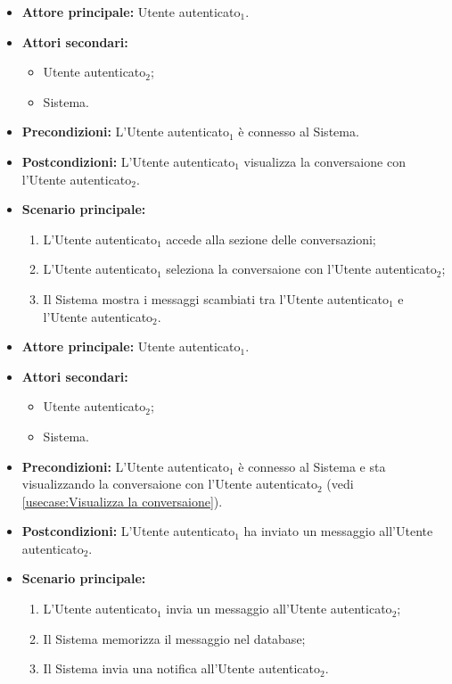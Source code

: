 \label{usecase:Visualizza la conversaione}
\begin{itemize}
	\item \textbf{Attore principale:} Utente autenticato$_1$.
	\item \textbf{Attori secondari:}
	      \begin{itemize}
		      \item Utente autenticato$_2$;
		      \item Sistema.
	      \end{itemize}
	\item \textbf{Precondizioni:} L'Utente autenticato$_1$ è connesso al
	      Sistema.
	\item \textbf{Postcondizioni:} L'Utente autenticato$_1$ visualizza la conversaione
	      con l'Utente autenticato$_2$.

	\item \textbf{Scenario principale:}
	      \begin{enumerate}
		      \item L'Utente autenticato$_1$ accede alla sezione delle conversazioni;
		      \item L'Utente autenticato$_1$ seleziona la conversaione con l'Utente
		            autenticato$_2$;
		      \item Il Sistema mostra i messaggi scambiati tra l'Utente
		            autenticato$_1$ e l'Utente autenticato$_2$.
	      \end{enumerate}
\end{itemize}

\label{usecase:Invia un messaggio}
\begin{itemize}
	\item \textbf{Attore principale:} Utente autenticato$_1$.
	\item \textbf{Attori secondari:}
	      \begin{itemize}
		      \item Utente autenticato$_2$;
		      \item Sistema.
	      \end{itemize}
	\item \textbf{Precondizioni:} L'Utente autenticato$_1$ è connesso al
	      Sistema e sta visualizzando la conversaione con l'Utente autenticato$_2$ (vedi
	      \autoref{usecase:Visualizza la conversaione}).

	\item \textbf{Postcondizioni:} L'Utente autenticato$_1$ ha inviato un
	      messaggio all'Utente autenticato$_2$.
	\item \textbf{Scenario principale:}
	      \begin{enumerate}
		      \item L'Utente autenticato$_1$ invia un messaggio all'Utente
		            autenticato$_2$;
		      \item Il Sistema memorizza il messaggio nel database;
		      \item Il Sistema invia una notifica all'Utente autenticato$_2$.
	      \end{enumerate}
\end{itemize}

